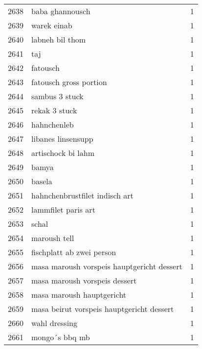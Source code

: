 \begin{tabular}{llr}
2638 &                                    baba ghannousch &      1 \\
2639 &                                        warek einab &      1 \\
2640 &                                    labneh bil thom &      1 \\
2641 &                                                taj &      1 \\
2642 &                                           fatousch &      1 \\
2643 &                             fatousch gross portion &      1 \\
2644 &                                     sambus 3 stuck &      1 \\
2645 &                                      rekak 3 stuck &      1 \\
2646 &                                        hahnchenleb &      1 \\
2647 &                                 libanes linsensupp &      1 \\
2648 &                                 artischock bi lahm &      1 \\
2649 &                                              bamya &      1 \\
2650 &                                             basela &      1 \\
2651 &                     hahnchenbrustfilet indisch art &      1 \\
2652 &                                lammfilet paris art &      1 \\
2653 &                                              schal &      1 \\
2654 &                                       maroush tell &      1 \\
2655 &                          fischplatt ab zwei person &      1 \\
2656 &         masa maroush vorspeis hauptgericht dessert &      1 \\
2657 &                      masa maroush vorspeis dessert &      1 \\
2658 &                          masa maroush hauptgericht &      1 \\
2659 &          masa beirut vorspeis hauptgericht dessert &      1 \\
2660 &                                      wahl dressing &      1 \\
2661 &                                     mongo´s bbq mb &      1 \\

\end{tabular}
